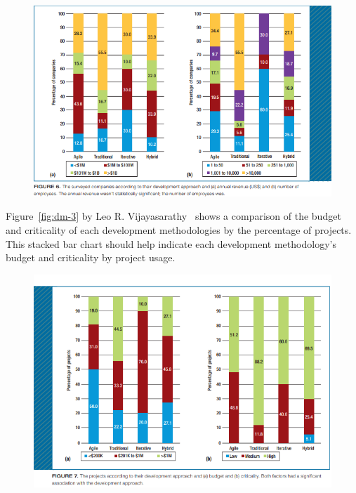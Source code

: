 \documentclass[12pt]{report} %
\begin{document}
		\begin{figure}[H]
			{\includegraphics[scale=0.45]{Figures/dm/dm-2.png}}
		\end{figure}

		Figure~\ref{fig:dm-3} by Leo R. Vijayasarathy~\cite{vijayasarathy_choice_2016} shows a comparison of the budget and criticality of each development methodologies by the percentage of projects. This stacked bar chart should help indicate each development methodology's budget and criticality by project usage.
		
		\begin{figure}[H]
			{\includegraphics[scale=0.45]{Figures/dm/dm-3.png}}
		\end{figure}
\end{document}
